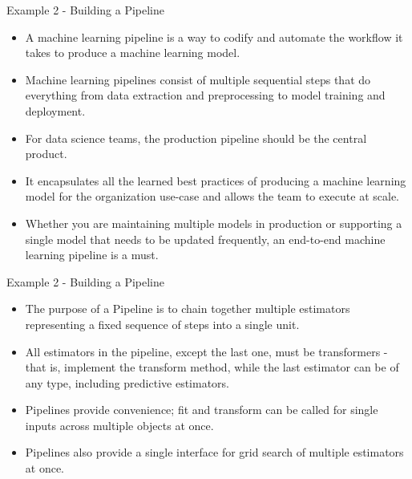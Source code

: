 \documentclass[11pt]{beamer}
\begin{document}
\begin{frame}{Example 2 - Building a Pipeline }
	\begin{itemize}
		\item A machine learning pipeline is a way to codify and automate the workflow it takes to produce a machine learning model. 
		\item Machine learning pipelines consist of multiple sequential steps that do everything from data extraction and preprocessing to model training and deployment.
		\item For data science teams, the production pipeline should be the central product. 
		\item It encapsulates all the learned best practices of producing a machine learning model for the organization use-case and allows the team to execute at scale. 
		\item Whether you are maintaining multiple models in production or supporting a single model that needs to be updated frequently, an end-to-end machine learning pipeline is a must.
	\end{itemize}
\end{frame}
\begin{frame}{Example 2 - Building a Pipeline}
	\begin{itemize}
		\item The purpose of a Pipeline is to chain together multiple estimators representing a fixed sequence of steps into a single unit. 
		\item All estimators in the pipeline, except the last one, must be transformers - that is, implement the transform method, while the last estimator can be of any type, including predictive estimators. 
		\item Pipelines provide convenience; fit and transform can be called for single inputs across multiple objects at once. 
		\item Pipelines also provide a single interface for grid search of multiple estimators at once. 
	\end{itemize}
\end{frame}
\end{document}
